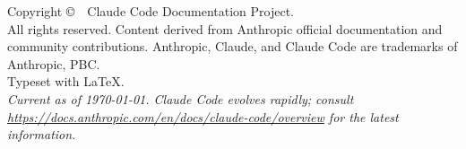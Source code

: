 \thispagestyle{empty}
\vspace*{\fill}
\noindent
Copyright \copyright\ \the\year\ Claude Code Documentation Project.\\[6pt]
All rights reserved. Content derived from Anthropic official documentation
and community contributions. Anthropic, Claude, and Claude Code are trademarks
of Anthropic, PBC.\\[6pt]
Typeset with \LaTeX.\\[6pt]
\noindent
\textit{Current as of \today. Claude Code evolves rapidly; consult
\url{https://docs.anthropic.com/en/docs/claude-code/overview} for the latest
information.}
\cleardoublepage
